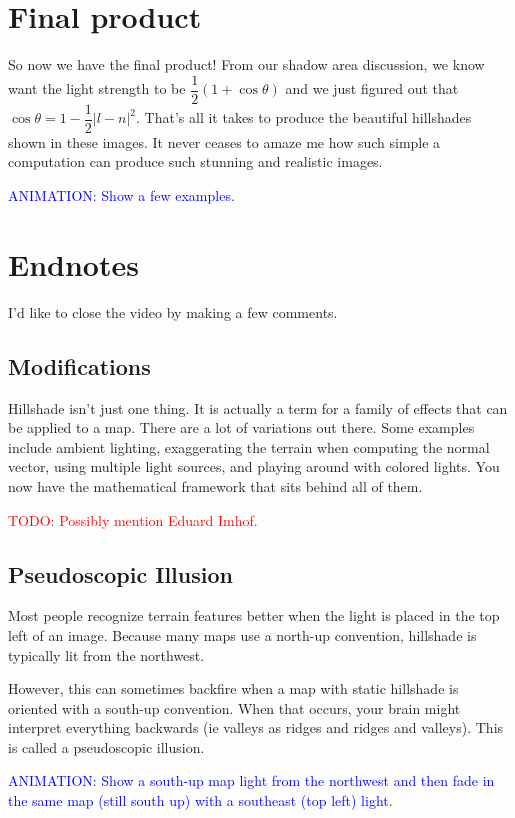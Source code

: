 \documentclass{article}
\newcommand\todo[1]{\textcolor{red}{TODO: #1}}
\newcommand\animation[1]{\textcolor{blue}{ANIMATION: #1}}
\begin{document}
\section{Final product}

So now we have the final product!
From our shadow area discussion, we know want the light strength to be $\dfrac{1}{2}(1 + \cos \theta)$ and we just figured out that $\cos \theta = 1 - \dfrac{1}{2}|l-n|^2$.
That's all it takes to produce the beautiful hillshades shown in these images.
It never ceases to amaze me how such simple a computation can produce such stunning and realistic images.

\animation{Show a few examples.}

\section{Endnotes}

I'd like to close the video by making a few comments.

\subsection{Modifications}

Hillshade isn't just one thing.
It is actually a term for a family of effects that can be applied to a map.
There are a lot of variations out there.
Some examples include ambient lighting, exaggerating the terrain when computing the normal vector, using multiple light sources, and playing around with colored lights.
You now have the mathematical framework that sits behind all of them.

\todo{Possibly mention Eduard Imhof.}

\subsection{Pseudoscopic Illusion}

Most people recognize terrain features better when the light is placed in the top left of an image.
Because many maps use a north-up convention, hillshade is typically lit from the northwest.

However, this can sometimes backfire when a map with static hillshade is oriented with a south-up convention.
When that occurs, your brain might interpret everything backwards (ie valleys as ridges and ridges and valleys).
This is called a pseudoscopic illusion.

\animation{Show a south-up map light from the northwest and then fade in the same map (still south up) with a southeast (top left) light}.
\end{document}
